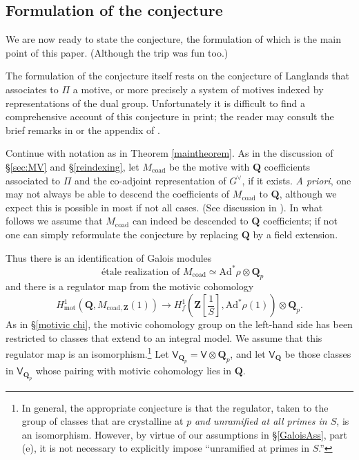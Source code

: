 \documentclass[10pt]{amsart}
\newcommand{\Z}{\mathbf{Z}}
\newcommand{\mot}{\mathrm{mot}}
\newcommand{\coad}{\mathrm{coad}}
\newcommand{\Ad}{\mathrm{Ad}}
\newcommand{\Q}{\mathbf{Q}}
\theoremstyle{remark}
\begin{document}
\medskip






\subsection{Formulation of the conjecture}
We are now ready to state the conjecture, the formulation of which is the main point of this paper. 
(Although the trip was fun too.) 

The formulation of the conjecture itself rests on the conjecture of Langlands that associates  
to $\Pi$ a motive, or more precisely a system of motives indexed by representations of the dual group. 
 Unfortunately it is difficult to find a comprehensive account of this conjecture in print;  the reader may consult
the brief remarks in \cite{Langlands} or the appendix of \cite{PV}.  


Continue with notation as in Theorem \ref{maintheorem}.   
As in    the discussion of \S \ref{sec:MV} and \S \ref{reindexing},
let $M_{\coad}$ be the motive  with $\Q$ coefficients associated to $\Pi$ and the co-adjoint representation of $G^{\vee}$, if it  exists. {\em A priori},
one may not always be able to descend the coefficients of $M_{\coad}$ to $\Q$, although we expect this is possible in most if not all cases.  (See discussion
in \cite[Appendix, A.3]{PV}).  In what follows we assume that $M_{\coad}$ can indeed be descended to $\Q$ coefficients; if not 
one can simply reformulate the conjecture by replacing $\Q$ by a field extension. 


Thus there is an identification of Galois modules
$$ \mbox{ {\'e}tale realization of $M_{\coad}$}  \simeq \Ad^* \rho  \otimes \Q_p$$
 and there is 
 a regulator map   from the motivic cohomology 
 $$H^1_{\mot}(\Q, M_{\coad,\Z}(1)) \longrightarrow H^1_f(\Z[\frac{1}{S}], \Ad^* \rho(1)) \otimes  \Q_p.$$
  As in \S \ref{motivic chi}, the motivic cohomology group on the left-hand side has been restricted
to classes that extend to an integral model.
  We assume that this regulator map is an isomorphism.\footnote{
  In general, the appropriate conjecture is that the regulator, taken to the group of classes that are crystalline at $p$
  {\em and unramified at all primes in $S$}, is an isomorphism. However, by virtue of our assumptions in 
  \S \ref{GaloisAss}, part (e), it is not necessary to explicitly impose ``unramified at primes in $S$.''}
 Let $\mathsf{V}_{\Q_p} = \mathsf{V} \otimes  \Q_p$,
 and let $\mathsf{V}_{\Q}$ be those classes in $\mathsf{V}_{\Q_p}$
 whose pairing with  motivic cohomology
 lies in $\Q$. 
 
\end{document}

